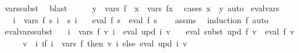 \begin{isabellebody}
\ vars{\isacharunderscore}{\kern0pt}subst\ \isamarkupfalse%
\ blast\isanewline
\ \ \isamarkupfalse%
\ \isamarkupfalse%
\ {\isachardoublequoteopen}y\ {\isasymin}\ vars\ f\ {\isacharminus}{\kern0pt}\ {\isacharbraceleft}{\kern0pt}x{\isacharbraceright}{\kern0pt}\ {\isasymunion}\ vars\ fx{\isachardoublequoteclose}\ \isamarkupfalse%
\ {\isacharparenleft}{\kern0pt}cases\ {\isachardoublequoteopen}x\ {\isacharequal}{\kern0pt}\ y{\isacharprime}{\kern0pt}{\isachardoublequoteclose}{\isacharparenright}{\kern0pt}\ auto\isanewline
{}\isamarkupfalse%
%
\endisatagproof
{\isafoldproof}%
%
\isadelimproof
\isanewline
%
\endisadelimproof
\isanewline
\isanewline
{}\isamarkupfalse%
\ eval{\isacharunderscore}{\kern0pt}vars{\isacharcolon}{\kern0pt}\isanewline
\ \ \ {\isachardoublequoteopen}{\isasymforall}i\ {\isasymin}\ vars\ f{\isachardot}{\kern0pt}\ s\ i\ {\isacharequal}{\kern0pt}\ s{\isacharprime}{\kern0pt}\ i{\isachardoublequoteclose}\isanewline
\ \ \ {\isachardoublequoteopen}eval\ f\ s\ {\isacharequal}{\kern0pt}\ eval\ f\ s{\isacharprime}{\kern0pt}{\isachardoublequoteclose}\isanewline
%
\isadelimproof
\ \ %
\endisadelimproof
%
\isatagproof
{}\isamarkupfalse%
\ assms\ \isamarkupfalse%
\ {\isacharparenleft}{\kern0pt}induction\ f{\isacharparenright}{\kern0pt}\ auto%
\endisatagproof
{\isafoldproof}%
%
\isadelimproof
\isanewline
%
\endisadelimproof
\isanewline
{}\isamarkupfalse%
\ eval{\isacharunderscore}{\kern0pt}vars{\isacharunderscore}{\kern0pt}subst{\isacharcolon}{\kern0pt}\isanewline
\ \ \ {\isachardoublequoteopen}{\isasymforall}i\ {\isasymin}\ vars\ f{\isachardot}{\kern0pt}\ v\ i\ {\isacharequal}{\kern0pt}\ eval\ {\isacharparenleft}{\kern0pt}upd\ i{\isacharparenright}{\kern0pt}\ v{\isachardoublequoteclose}\isanewline
\ \ \ {\isachardoublequoteopen}eval\ {\isacharparenleft}{\kern0pt}subst\ upd\ f{\isacharparenright}{\kern0pt}\ v\ {\isacharequal}{\kern0pt}\ eval\ f\ v{\isachardoublequoteclose}\isanewline
%
\isadelimproof
%
\endisadelimproof
%
\isatagproof
{}\isamarkupfalse%
\ {\isacharminus}{\kern0pt}\isanewline
\ \ \isamarkupfalse%
\ {\isacharquery}{\kern0pt}v{\isacharprime}{\kern0pt}\ {\isacharequal}{\kern0pt}\ {\isachardoublequoteopen}{\isasymlambda}i{\isachardot}{\kern0pt}\ if\ i\ {\isasymin}\ vars\ f\ then\ v\ i\ else\ eval\ {\isacharparenleft}{\kern0pt}upd\ i{\isacharparenright}{\kern0pt}\ v{\isachardoublequoteclose}\isanewline

\end{isabellebody}
